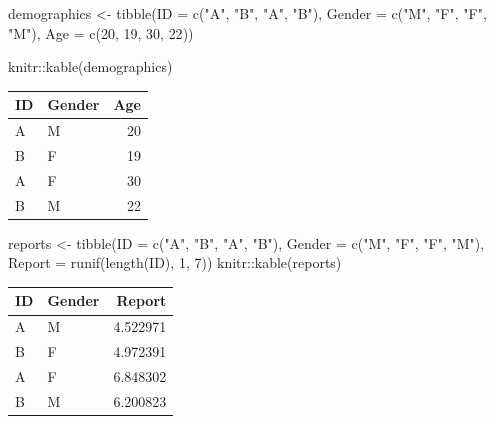 \documentclass[
]{book}
\newenvironment{Shaded}{\begin{snugshade}}{\end{snugshade}}
\newcommand{\AttributeTok}[1]{\textcolor[rgb]{0.77,0.63,0.00}{#1}}
\newcommand{\DecValTok}[1]{\textcolor[rgb]{0.00,0.00,0.81}{#1}}
\newcommand{\FunctionTok}[1]{\textcolor[rgb]{0.00,0.00,0.00}{#1}}
\newcommand{\NormalTok}[1]{#1}
\newcommand{\OtherTok}[1]{\textcolor[rgb]{0.56,0.35,0.01}{#1}}
\newcommand{\SpecialCharTok}[1]{\textcolor[rgb]{0.00,0.00,0.00}{#1}}
\newcommand{\StringTok}[1]{\textcolor[rgb]{0.31,0.60,0.02}{#1}}
\begin{document}
\begin{Shaded}
\begin{Highlighting}[]
\NormalTok{demographics }\OtherTok{\textless{}{-}} \FunctionTok{tibble}\NormalTok{(}\AttributeTok{ID =} \FunctionTok{c}\NormalTok{(}\StringTok{"A"}\NormalTok{, }\StringTok{"B"}\NormalTok{, }\StringTok{"A"}\NormalTok{, }\StringTok{"B"}\NormalTok{),}
                       \AttributeTok{Gender =} \FunctionTok{c}\NormalTok{(}\StringTok{"M"}\NormalTok{, }\StringTok{"F"}\NormalTok{, }\StringTok{"F"}\NormalTok{, }\StringTok{"M"}\NormalTok{),}
                       \AttributeTok{Age =} \FunctionTok{c}\NormalTok{(}\DecValTok{20}\NormalTok{, }\DecValTok{19}\NormalTok{, }\DecValTok{30}\NormalTok{, }\DecValTok{22}\NormalTok{))}

\NormalTok{knitr}\SpecialCharTok{::}\FunctionTok{kable}\NormalTok{(demographics)}
\end{Highlighting}
\end{Shaded}

\begin{tabular}{l|l|r}
\hline
ID & Gender & Age\\
\hline
A & M & 20\\
\hline
B & F & 19\\
\hline
A & F & 30\\
\hline
B & M & 22\\
\hline
\end{tabular}

\begin{Shaded}
\begin{Highlighting}[]
\NormalTok{reports }\OtherTok{\textless{}{-}} \FunctionTok{tibble}\NormalTok{(}\AttributeTok{ID =} \FunctionTok{c}\NormalTok{(}\StringTok{"A"}\NormalTok{, }\StringTok{"B"}\NormalTok{, }\StringTok{"A"}\NormalTok{, }\StringTok{"B"}\NormalTok{),}
                  \AttributeTok{Gender =} \FunctionTok{c}\NormalTok{(}\StringTok{"M"}\NormalTok{, }\StringTok{"F"}\NormalTok{, }\StringTok{"F"}\NormalTok{, }\StringTok{"M"}\NormalTok{),}
                  \AttributeTok{Report =} \FunctionTok{runif}\NormalTok{(}\FunctionTok{length}\NormalTok{(ID), }\DecValTok{1}\NormalTok{, }\DecValTok{7}\NormalTok{))}
\NormalTok{knitr}\SpecialCharTok{::}\FunctionTok{kable}\NormalTok{(reports)}
\end{Highlighting}
\end{Shaded}

\begin{tabular}{l|l|r}
\hline
ID & Gender & Report\\
\hline
A & M & 4.522971\\
\hline
B & F & 4.972391\\
\hline
A & F & 6.848302\\
\hline
B & M & 6.200823\\
\hline
\end{tabular}
\end{document}
